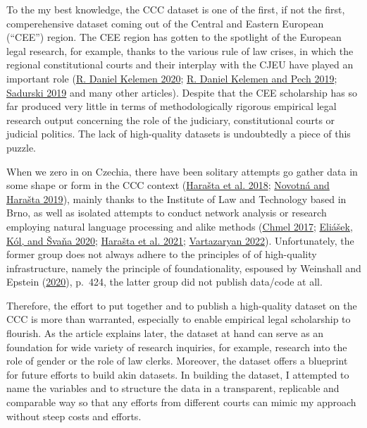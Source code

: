 \documentclass[
  11pt,
]{article}
\begin{document}
To the my best knowledge, the CCC dataset is one of the first, if not
the first, comperehensive dataset coming out of the Central and Eastern
European (``CEE'') region. The CEE region has gotten to the spotlight of
the European legal research, for example, thanks to the various rule of
law crises, in which the regional constitutional courts and their
interplay with the CJEU have played an important role
(\protect\hyperlink{ref-kelemenEuropeanUnionAuthoritarian2020}{R. Daniel
Kelemen 2020};
\protect\hyperlink{ref-kelemenUsesAbusesConstitutional2019}{R. Daniel
Kelemen and Pech 2019};
\protect\hyperlink{ref-sadurskiPolandConstitutionalBreakdown2019}{Sadurski
2019} and many other articles). Despite that the CEE scholarship has so
far produced very little in terms of methodologically rigorous empirical
legal research output concerning the role of the judiciary,
constitutional courts or judicial politics. The lack of high-quality
datasets is undoubtedly a piece of this puzzle.

When we zero in on Czechia, there have been solitary attempts go gather
data in some shape or form in the CCC context
(\protect\hyperlink{ref-harastaAnnotatedCorpusCzech2018}{Harašta et al.
2018}; \protect\hyperlink{ref-novotnaCzechCourtDecisions2019}{Novotná
and Harašta 2019}), mainly thanks to the Institute of Law and Technology
based in Brno, as well as isolated attempts to conduct network analysis
or research employing natural language processing and alike methods
(\protect\hyperlink{ref-chmelZpravodajoveSenatyVliv2017}{Chmel 2017};
\protect\hyperlink{ref-eliasekAutomatickaKlasifikaceVyznamovych2020}{Eliášek,
Kól, and Švaňa 2020};
\protect\hyperlink{ref-harastaCitacniAnalyzaJudikatury2021}{Harašta et
al. 2021};
\protect\hyperlink{ref-vartazaryanSitOvaAnalyza2022}{Vartazaryan 2022}).
Unfortunately, the former group does not always adhere to the principles
of of high-quality infrastructure, namely the principle of
foundationality, espoused by Weinshall and Epstein
(\protect\hyperlink{ref-weinshallDevelopingHighQualityData2020}{2020}),
p.~424, the latter group did not publish data/code at all.

Therefore, the effort to put together and to publish a high-quality
dataset on the CCC is more than warranted, especially to enable
empirical legal scholarship to flourish. As the article explains later,
the dataset at hand can serve as an foundation for wide variety of
research inquiries, for example, research into the role of gender or the
role of law clerks. Moreover, the dataset offers a blueprint for future
efforts to build akin datasets. In building the dataset, I attempted to
name the variables and to structure the data in a transparent,
replicable and comparable way so that any efforts from different courts
can mimic my approach without steep costs and efforts.
\end{document}
